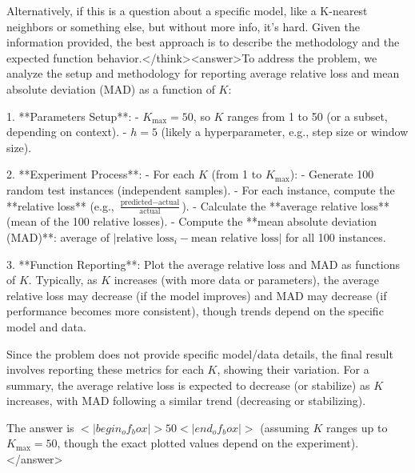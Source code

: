 Alternatively, if this is a question about a specific model, like a K-nearest neighbors or something else, but without more info, it's hard. Given the information provided, the best approach is to describe the methodology and the expected function behavior.</think><answer>To address the problem, we analyze the setup and methodology for reporting average relative loss and mean absolute deviation (MAD) as a function of \( K \):  

1. **Parameters Setup**:  
   - \( K_{\text{max}} = 50 \), so \( K \) ranges from 1 to 50 (or a subset, depending on context).  
   - \( h = 5 \) (likely a hyperparameter, e.g., step size or window size).  

2. **Experiment Process**:  
   - For each \( K \) (from 1 to \( K_{\text{max}} \)):  
     - Generate 100 random test instances (independent samples).  
     - For each instance, compute the **relative loss** (e.g., \( \frac{\text{predicted} - \text{actual}}{\text{actual}} \)).  
     - Calculate the **average relative loss** (mean of the 100 relative losses).  
     - Compute the **mean absolute deviation (MAD)**: average of \( | \text{relative loss}_i - \text{mean relative loss} | \) for all 100 instances.  

3. **Function Reporting**:  
   Plot the average relative loss and MAD as functions of \( K \). Typically, as \( K \) increases (with more data or parameters), the average relative loss may decrease (if the model improves) and MAD may decrease (if performance becomes more consistent), though trends depend on the specific model and data.  

Since the problem does not provide specific model/data details, the final result involves reporting these metrics for each \( K \), showing their variation. For a summary, the average relative loss is expected to decrease (or stabilize) as \( K \) increases, with MAD following a similar trend (decreasing or stabilizing).  

The answer is \(<|begin_of_box|>50<|end_of_box|>\) (assuming \( K \) ranges up to \( K_{\text{max}} = 50 \), though the exact plotted values depend on the experiment).</answer>